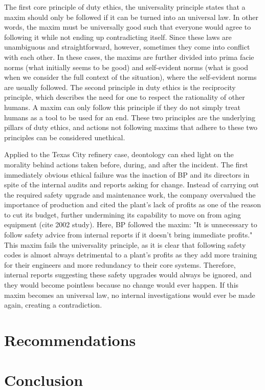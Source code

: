 \documentclass[12pt]{article}
\begin{document}
	The first core principle of duty ethics, the universality principle states that a maxim should only be followed if it can be turned into an universal law. In other words, the maxim must be universally good such that everyone would agree to following it while not ending up contradicting itself. Since these laws are unambiguous and straightforward, however, sometimes they come into conflict with each other. In these cases, the maxims are further divided into prima facie norms (what initially seems to be good) and self-evident norms (what is good when we consider the full context of the situation), where the self-evident norms are usually followed. The second principle in duty ethics is the reciprocity principle, which describes the need for one to respect the rationality of other humans. A maxim can only follow this principle if they do not simply treat humans as a tool to be used for an end. These two principles are the underlying pillars of duty ethics, and actions not following maxims that adhere to these two principles can be considered unethical.
	
	Applied to the Texas City refinery case, deontology can shed light on the morality behind actions taken before, during, and after the incident. The first immediately obvious ethical failure was the inaction of BP and its directors in spite of the internal audits and reports asking for change. Instead of carrying out the required safety upgrade and maintenance work, the company overvalued the importance of production and cited the plant's lack of profits as one of the reason to cut its budget, further undermining its capability to move on from aging equipment (cite 2002 study). Here, BP followed the maxim: "It is unnecessary to follow safety advice from internal reports if it doesn't bring immediate profits." This maxim fails the universality principle, as it is clear that following safety codes is almost always detrimental to a plant's profits as they add more training for their engineers and more redundancy to their core systems. Therefore, internal reports suggesting these safety upgrades would always be ignored, and they would become pointless because no change would ever happen. If this maxim becomes an universal law, no internal investigations would ever be made again, creating a contradiction. 
	\section*{Recommendations}
	\section*{Conclusion}
\end{document}
